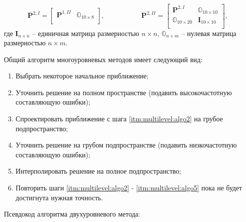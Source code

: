 \documentclass[a4paper,14pt]{article}
\begin{document}
\begin{equation*}
	\mathbf{P}^{2,I} = \left[
	\begin{matrix}
		\mathbf{P}^{1,II} & \mathbb{O}_{10 \times 8} \\
	\end{matrix}
	\right],
\text{~~~~~~~~~~~~~~~~}
	\mathbf{P}^{2,II} = \left[
	\begin{matrix}
		\mathbf{P}^{2,I} & \mathbb{O}_{10 \times 10} \\
		\mathbb{O}_{10 \times 20} & \mathbf{I}_{10 \times 10} \\
	\end{matrix}
	\right],
\end{equation*}
где $\mathbf{I}_{n \times n}$ -- единичная матрица размерностью $n \times n$, $\mathbb{O}_{n \times m}$ -- нулевая матрица размерностью $n \times m$.

Общий алгоритм многоуровневых методов имеет следующий вид:
\begin{enumerate}
	\item \label{itm:multilevel:algo1} Выбрать некоторое начальное приближение;
	\item \label{itm:multilevel:algo2} Уточнить решение на полном пространстве (подавить высокочастотную составляющую ошибки);
	\item \label{itm:multilevel:algo3} Спроектировать приближение с шага \ref{itm:multilevel:algo2} на грубое подпространство;
	\item \label{itm:multilevel:algo4} Уточнить решение на грубом подпространстве (подавить низкочастотную составляющую ошибки);
	\item \label{itm:multilevel:algo5} Интерполировать решение на полное подпространство;
	\item \label{itm:multilevel:algo6} Повторить шаги \ref{itm:multilevel:algo2} - \ref{itm:multilevel:algo5} пока не будет достигнута нужная точность.
\end{enumerate}

Псевдокод алгоритма двухуровневого метода:
\end{document}

